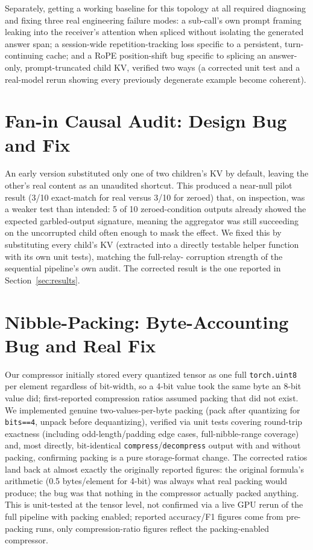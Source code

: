 \documentclass[11pt]{article}
\begin{document}
Separately, getting a working baseline for this topology at all
required diagnosing and fixing three real engineering failure modes: a
sub-call's own prompt framing leaking into the receiver's attention
when spliced without isolating the generated answer span; a
session-wide repetition-tracking loss specific to a persistent,
turn-continuing cache; and a RoPE position-shift bug specific to
splicing an answer-only, prompt-truncated child KV, verified two ways
(a corrected unit test and a real-model rerun showing every previously
degenerate example become coherent).

\section{Fan-in Causal Audit: Design Bug and Fix}
\label{app:faninbug}

An early version substituted only one of two children's KV by default,
leaving the other's real content as an unaudited shortcut. This
produced a near-null pilot result (3/10 exact-match for real versus
3/10 for zeroed) that, on inspection, was a weaker test than intended:
5 of 10 zeroed-condition outputs already showed the expected
garbled-output signature, meaning the aggregator was still succeeding
on the uncorrupted child often enough to mask the effect. We fixed this
by substituting every child's KV (extracted into a directly testable
helper function with its own unit tests), matching the full-relay-
corruption strength of the sequential pipeline's own audit. The
corrected result is the one reported in Section~\ref{sec:results}.

\section{Nibble-Packing: Byte-Accounting Bug and Real Fix}
\label{app:nibble}

Our compressor initially stored every quantized tensor as one full
\texttt{torch.uint8} per element regardless of bit-width, so a 4-bit
value took the same byte an 8-bit value did; first-reported compression
ratios assumed packing that did not exist. We implemented genuine
two-values-per-byte packing (pack after quantizing for \texttt{bits==4},
unpack before dequantizing), verified via unit tests covering
round-trip exactness (including odd-length/padding edge cases,
full-nibble-range coverage) and, most directly, bit-identical
\texttt{compress}/\texttt{decompress} output with and without packing,
confirming packing is a pure storage-format change. The corrected
ratios land back at almost exactly the originally reported figures: the
original formula's arithmetic (0.5 bytes/element for 4-bit) was always
what real packing would produce; the bug was that nothing in the
compressor actually packed anything. This is unit-tested at the tensor
level, not confirmed via a live GPU rerun of the full pipeline with
packing enabled; reported accuracy/F1 figures come from pre-packing
runs, only compression-ratio figures reflect the packing-enabled
compressor.
\end{document}
